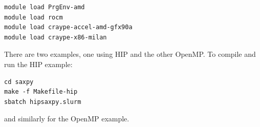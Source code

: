 \documentclass{article}
\begin{document}
\begin{verbatim}
module load PrgEnv-amd
module load rocm
module load craype-accel-amd-gfx90a
module load craype-x86-milan
\end{verbatim}

There are two examples, one using HIP and the other OpenMP. To compile and run the HIP example:

\begin{verbatim}
cd saxpy
make -f Makefile-hip
sbatch hipsaxpy.slurm
\end{verbatim}

and similarly for the OpenMP example.
\end{document}
